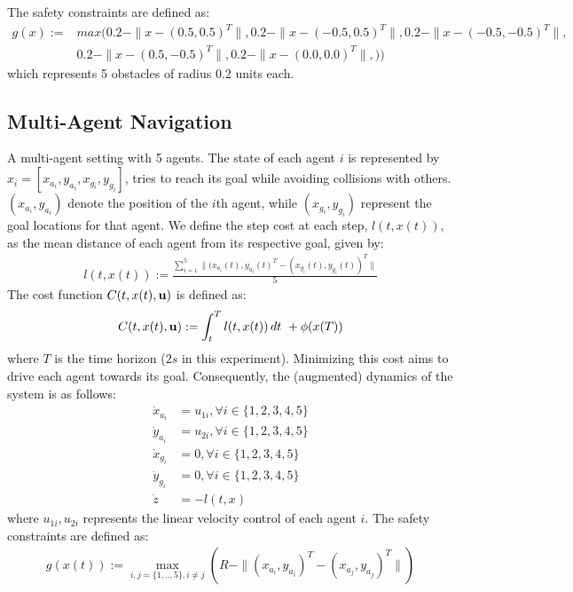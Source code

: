 The safety constraints are defined as:
\begin{align*}
    g(x) :=& max ( 0.2 - \|x - (0.5, 0.5)^T \|,  0.2 - \|x - (-0.5, 0.5)^T \|, 0.2 - \|x - (-0.5, -0.5)^T \|,\\
    &0.2 - \|x - (0.5, -0.5)^T \|, 0.2 - \|x - (0.0, 0.0)^T \|,) )
\end{align*}
which represents 5 obstacles of radius 0.2 units each.



\subsection{Multi-Agent Navigation}\label{appendix: MultiAgent}

A multi-agent setting with 5 agents. The state of each agent $i$ is represented by $x_i = [x_{a_i}, y_{a_i}, x_{g_i}, y_{g_i}]$, tries to reach its goal while avoiding collisions with others. $(x_{a_i}, y_{a_i})$ denote the position of the $i$th agent, while $(x_{g_i}, y_{g_i})$ represent the goal locations for that agent. We define the step cost at each step, $l(t,x(t))$, as the mean distance of each agent from its respective goal, given by:
\begin{align*}
    l(t, x(t)) := \frac{\sum_{i=1}^{5}\| (x_{a_i}(t), y_{a_i}(t)^T - (x_{g_i}(t), y_{g_i}(t))^T\|}{5}
\end{align*}
The cost function $C(t, x(t), \mathbf{u})$ is defined as:
\begin{equation}
 \begin{aligned}
     C(t,x(t), \mathbf{u}) := \int_t^{T} l(t, x(t)) \, dt ~ +
     \phi(x(T))
   \end{aligned}
\end{equation}
where $T$ is the time horizon ($2s$ in this experiment). Minimizing this cost aims to drive each agent towards its goal. 
Consequently, the (augmented) dynamics of the system is as follows:
\begin{align*}
    \dot{x}_{a_i} &= u_{1i}, \forall i \in \{ 1,2,3,4,5\}\\
    \dot{y}_{a_i} &= u_{2i}, \forall i \in \{ 1,2,3,4,5\} \\
    \dot{x}_{g_i} &= 0, \forall i \in \{ 1,2,3,4,5\}\\
    \dot{y}_{g_i} &= 0, \forall i \in \{ 1,2,3,4,5\} \\
    \dot{z} &= - l(t,x)
\end{align*}
where $u_{1i}, u_{2i}$ represents the linear velocity control of each agent $i$.
The safety constraints are defined as:
\begin{equation}
\begin{aligned}
    g(x(t)) := \max_{i, j=\{1,..,5 \}, i\neq j} ( R - \|(x_{a_i}, y_{a_i})^T -  (x_{a_j}, y_{a_j})^T \|)
\end{aligned}
\end{equation}

